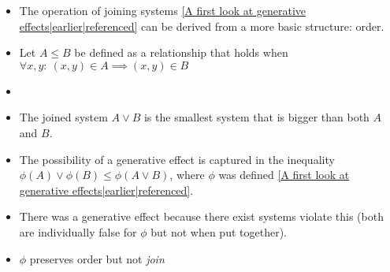 \begin{itemize}
    \item The operation of joining systems \ref{A first look at generative effects|earlier|referenced} can be derived from a more basic structure: order.

    \item Let $A \leq B$ be defined as a relationship that holds when $\forall x,y:\ (x,y) \in A \implies (x,y) \in B$
    \item  {}
    \item  The joined system $A \lor B$ is the smallest system that is bigger than both $A$ and $B$.
    \item The possibility of a generative effect is captured in the inequality $\phi(A) \lor \phi(B) \leq \phi(A \lor B)$, where $\phi$ was defined \ref{A first look at generative effects|earlier|referenced}.
    \item There was a generative effect because there exist systems violate this (both are individually false for $\phi$ but not when put together).
    \item $\phi$ preserves order but not \emph{join}
  \end{itemize}